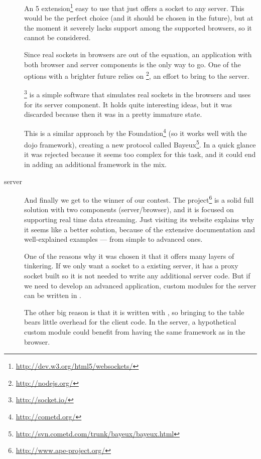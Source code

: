 \begin{description}
  \item[ ] An 5 extension\footnote{\url{http://dev.w3.org/html5/websockets/}} easy to use that just offers a socket to any server.
  This would be the perfect choice (and it should be chosen in the future), but at the moment it severely lacks support among the supported browsers, so it cannot be considered.
  \item[] Since real sockets in browsers are out of the equation, an application with both browser and server components is the only way to go.
  One of the options with a brighter future relies on \footnote{\url{http://nodejs.org/}}, an effort to bring  to the server.
  
  \footnote{\url{http://socket.io/}} is a simple software that simulates real sockets in the browsers and uses  for its server component.
  It holds quite interesting ideas, but it was discarded because then it was in a pretty immature state.
  \item[] This is a similar approach by the  Foundation\footnote{\url{http://cometd.org/}} (so it works well with the dojo framework), creating a new protocol called Bayeux\footnote{\url{http://svn.cometd.com/trunk/bayeux/bayeux.html}}.
  In a quick glance it was rejected because it seems too complex for this task, and it could end in adding an additional framework in the mix.
  \item[ server] And finally we get to the winner of our contest.
  The  project\footnote{\url{http://www.ape-project.org/}} is a solid full solution with two components (server/browser), and it is focused on supporting real time data streaming.
  Just visiting its website explains why it seems like a better solution, because of the extensive documentation and well-explained examples --- from simple to advanced ones.
  
  One of the reasons why it was chosen it that it offers many layers of tinkering.
  If we only want a socket to a existing server, it has a proxy socket built so it is not needed to write any additional server code.
  But if we need to develop an advanced application, custom modules for the server can be written in .
  
  The other big reason is that it is written with , so bringing  to the table bears little overhead for the client code.
  In the server, a hypothetical custom module could benefit from having the same framework as in the browser.
\end{description}

